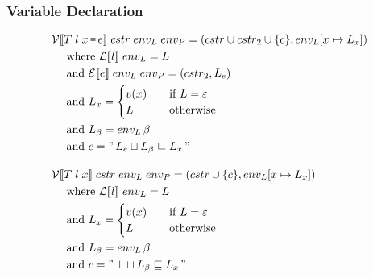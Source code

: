 \subsubsection{Variable Declaration}
\begin{align*}
& \iV\dblSq{T \; l \; x \tk = e} \; \icstr \; \ienvL \; \ienvP = (\icstr \cup \icstr_2 \cup \{ c \}, \ienvL[x \mapsto L_x]) \\
& \dsWhere{\iL\dblSq{l} \; \ienvL = L} \\
& \dsAnd{\iE\dblSq{e} \; \ienvL \; \ienvP = (\icstr_2, L_e)} \\
& \dsAnd{L_x = \begin{cases}
    v(x) & \quad \text{if } L = \varepsilon \\
    L & \quad \text{otherwise}
  \end{cases}} \\
& \dsAnd{L_\ib = \ienvL \, \ib} \\
& \dsAnd{c = " \, L_e \sqcup L_\ib \sqsubseteq L_x \, "} \rspace
& \iV\dblSq{T \; l \; x} \; \icstr \; \ienvL \; \ienvP = (cstr \cup \{ c \}, \ienvL[x \mapsto L_x])\\
& \dsWhere{\iL\dblSq{l} \; \ienvL = L} \\
& \dsAnd{L_x = \begin{cases}
    v(x) & \quad \text{if } L = \varepsilon \\
    L & \quad \text{otherwise}
  \end{cases}} \\
& \dsAnd{L_\ib = \ienvL \, \ib} \\
& \dsAnd{c = " \, \bot \sqcup L_\ib \sqsubseteq L_x \, "}
\end{align*}
